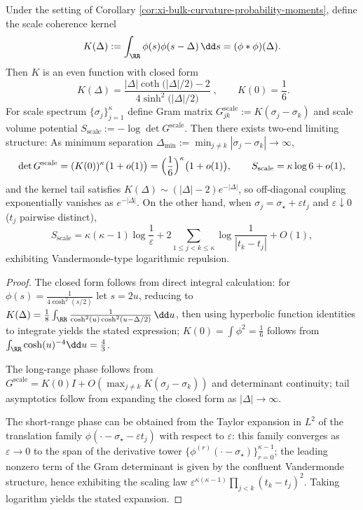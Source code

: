 \begin{proposition}\label{prop:xi-bulk-curvature-scale-gram-two-phase}
Under the setting of Corollary \ref{cor:xi-bulk-curvature-probability-moments}, define the scale coherence kernel
\[
K(\Delta):=\int_{\RR}\phi(s)\phi(s-\Delta)\,\dd s=(\phi*\phi)(\Delta).
\]
Then \(K\) is an even function with closed form
\[
\boxed{\;
K(\Delta)=\frac{|\Delta|\coth\!\bigl(|\Delta|/2\bigr)-2}{4\sinh^{2}\!\bigl(|\Delta|/2\bigr)}\; } ,
\qquad
K(0)=\frac{1}{6}.
\]
For scale spectrum \(\{\sigma_j\}_{j=1}^{\kappa}\) define Gram matrix
\(
G^{\mathrm{scale}}_{jk}:=K(\sigma_j-\sigma_k)
\)
and scale volume potential
\(
S_{\mathrm{scale}}:=-\log\det G^{\mathrm{scale}}
\).
Then there exists two-end limiting structure:
As minimum separation \(\Delta_{\min}:=\min_{j\neq k}|\sigma_j-\sigma_k|\to\infty\),
\[
\det G^{\mathrm{scale}}=(K(0))^{\kappa}\bigl(1+o(1)\bigr)=\Bigl(\frac16\Bigr)^{\kappa}\bigl(1+o(1)\bigr),
\qquad
S_{\mathrm{scale}}=\kappa\log 6+o(1),
\]
and the kernel tail satisfies \(K(\Delta)\sim (|\Delta|-2)e^{-|\Delta|}\), so off-diagonal coupling exponentially vanishes as \(e^{-|\Delta|}\).
On the other hand, when \(\sigma_j=\sigma_\star+\varepsilon t_j\) and \(\varepsilon\downarrow0\) (\(t_j\) pairwise distinct),
\[
S_{\mathrm{scale}}
=\kappa(\kappa-1)\log\frac{1}{\varepsilon}
+2\sum_{1\le j<k\le \kappa}\log\frac{1}{|t_k-t_j|}
+O(1),
\]
exhibiting Vandermonde-type logarithmic repulsion.
\end{proposition}
\begin{proof}
The closed form follows from direct integral calculation: for \(\phi(s)=\frac{1}{4\cosh^{2}(s/2)}\) let \(s=2u\), reducing to
\(
K(\Delta)=\frac18\int_{\RR}\frac{1}{\cosh^{2}(u)\cosh^{2}(u-\Delta/2)}\,\dd u
\),
then using hyperbolic function identities to integrate yields the stated expression; \(K(0)=\int \phi^2=\frac16\) follows from \(\int_{\RR}\cosh(u)^{-4}\dd u=\frac43\).
\par
The long-range phase follows from \(G^{\mathrm{scale}}=K(0)I+O(\max_{j\neq k}K(\sigma_j-\sigma_k))\) and determinant continuity; tail asymptotics follow from expanding the closed form as \(|\Delta|\to\infty\).
\par
The short-range phase can be obtained from the Taylor expansion in \(L^2\) of the translation family \(\phi(\cdot-\sigma_\star-\varepsilon t_j)\) with respect to \(\varepsilon\): this family converges as \(\varepsilon\to0\) to the span of the derivative tower \(\{\phi^{(r)}(\cdot-\sigma_\star)\}_{r=0}^{\kappa-1}\);
the leading nonzero term of the Gram determinant is given by the confluent Vandermonde structure, hence exhibiting the scaling law \(\varepsilon^{\kappa(\kappa-1)}\prod_{j<k}(t_k-t_j)^2\).
Taking logarithm yields the stated expansion.
\end{proof}

